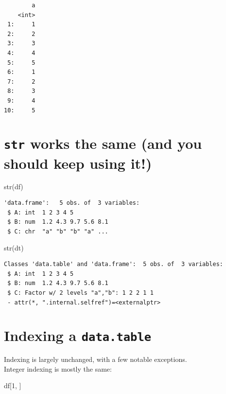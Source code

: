 \documentclass[
]{book}
\newenvironment{Shaded}{\begin{snugshade}}{\end{snugshade}}
\newcommand{\DecValTok}[1]{\textcolor[rgb]{0.00,0.00,0.81}{#1}}
\newcommand{\FunctionTok}[1]{\textcolor[rgb]{0.00,0.00,0.00}{#1}}
\newcommand{\NormalTok}[1]{#1}
\begin{document}
\begin{verbatim}
        a
    <int>
 1:     1
 2:     2
 3:     3
 4:     4
 5:     5
 6:     1
 7:     2
 8:     3
 9:     4
10:     5
\end{verbatim}

\hypertarget{str-works-the-same-and-you-should-keep-using-it}{%
\section{\texorpdfstring{\texttt{str} works the same (and you should keep using it!)}{str works the same (and you should keep using it!)}}\label{str-works-the-same-and-you-should-keep-using-it}}

\begin{Shaded}
\begin{Highlighting}[]
\FunctionTok{str}\NormalTok{(df)}
\end{Highlighting}
\end{Shaded}

\begin{verbatim}
'data.frame':   5 obs. of  3 variables:
 $ A: int  1 2 3 4 5
 $ B: num  1.2 4.3 9.7 5.6 8.1
 $ C: chr  "a" "b" "b" "a" ...
\end{verbatim}

\begin{Shaded}
\begin{Highlighting}[]
\FunctionTok{str}\NormalTok{(dt)}
\end{Highlighting}
\end{Shaded}

\begin{verbatim}
Classes 'data.table' and 'data.frame':  5 obs. of  3 variables:
 $ A: int  1 2 3 4 5
 $ B: num  1.2 4.3 9.7 5.6 8.1
 $ C: Factor w/ 2 levels "a","b": 1 2 2 1 1
 - attr(*, ".internal.selfref")=<externalptr> 
\end{verbatim}

\hypertarget{indexing-a-data.table}{%
\section{\texorpdfstring{Indexing a \texttt{data.table}}{Indexing a data.table}}\label{indexing-a-data.table}}

Indexing is largely unchanged, with a few notable exceptions.\\
Integer indexing is mostly the same:

\begin{Shaded}
\begin{Highlighting}[]
\NormalTok{df[}\DecValTok{1}\NormalTok{, ]}
\end{Highlighting}
\end{Shaded}
\end{document}

